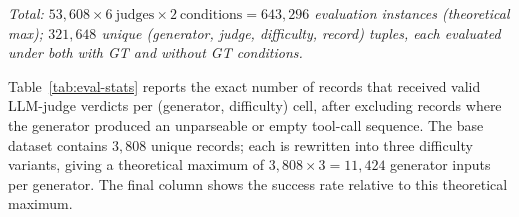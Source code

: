 \begin{table}[h!]
\centering
\small
\setlength{\tabcolsep}{8pt}
\renewcommand{\arraystretch}{1.2}
{\small\textit{Total: $53{,}608 \times 6\ \mathrm{judges} \times 2\ \mathrm{conditions} = 643{,}296$ evaluation instances (theoretical max); $321{,}648$ unique (generator, judge, difficulty, record) tuples, each evaluated under both with GT and without GT conditions.}}
\caption{Number of records with valid LLM-judge verdicts per generator and difficulty tier. \emph{Theoretical max} per generator is $3{,}808 \times 3 = 11{,}424$ (three difficulty variants of each base record). Judged records are identical across all six LLM judges for a given (generator, difficulty) cell. Multiplying the \emph{Total} column by $6$~judges~$\times~2$~conditions yields the full evaluation instance count per generator.}
\label{tab:eval-stats}

\end{table}

Table~\ref{tab:eval-stats} reports the exact number of records that received valid LLM-judge verdicts per (generator, difficulty) cell, after excluding records where the generator produced an unparseable or empty tool-call sequence. The base dataset contains $3{,}808$ unique records; each is rewritten into three difficulty variants, giving a theoretical maximum of $3{,}808 \times 3 = 11{,}424$ generator inputs per generator. The final column shows the success rate relative to this theoretical maximum.


